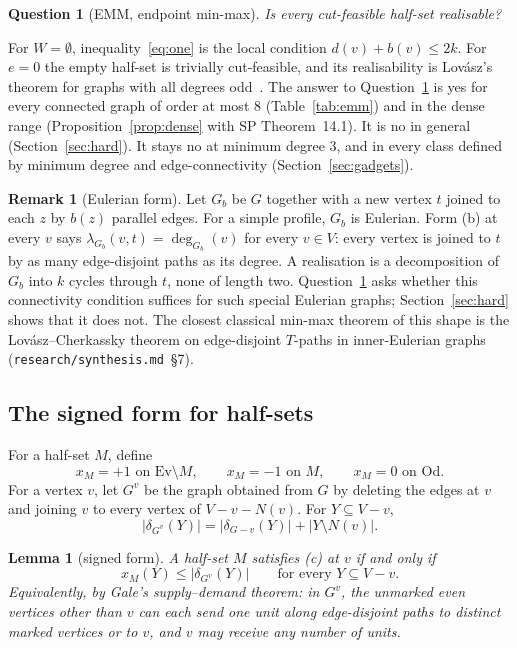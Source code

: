 \documentclass[11pt]{amsart}
\newtheorem{lemma}[theorem]{Lemma}
\newtheorem{question}[theorem]{Question}
\theoremstyle{definition}
\newtheorem{remark}[theorem]{Remark}
\newcommand{\Ev}{\mathrm{Ev}}
\newcommand{\Od}{\mathrm{Od}}
\begin{document}
\begin{question}[EMM, endpoint min-max]\label{conj:emm}
Is every cut-feasible half-set realisable?
\end{question}

For $W=\emptyset$, inequality~\eqref{eq:one} is the local condition $d(v)+b(v)\le 2k$. For $e=0$ the
empty half-set is trivially cut-feasible, and its realisability is Lov\'asz's theorem for graphs with
all degrees odd~\cite{L68}. The answer to Question~\ref{conj:emm} is yes for every connected graph of
order at most $8$ (Table~\ref{tab:emm}) and in the dense range (Proposition~\ref{prop:dense} with SP
Theorem~14.1). It is no in general (Section~\ref{sec:hard}). It stays no at minimum degree $3$, and in every
class defined by minimum degree and edge-connectivity (Section~\ref{sec:gadgets}).

\begin{remark}[Eulerian form]\label{rem:euler}
Let $G_b$ be $G$ together with a new vertex $t$ joined to each $z$ by $b(z)$ parallel edges. For a
simple profile, $G_b$ is Eulerian. Form (b) at every $v$ says $\lambda_{G_b}(v,t)=\deg_{G_b}(v)$ for
every $v\in V$: every vertex is joined to $t$ by as many edge-disjoint paths as its degree. A
realisation is a decomposition of $G_b$ into $k$ cycles through $t$, none of length two.
Question~\ref{conj:emm} asks whether this connectivity condition suffices for such special Eulerian
graphs; Section~\ref{sec:hard} shows that it does not. The closest
classical min-max theorem of this shape is the Lov\'asz--Cherkassky theorem on edge-disjoint
$T$-paths in inner-Eulerian graphs (\texttt{research/synthesis.md}~\S7).
\end{remark}

\subsection{The signed form for half-sets}
For a half-set $M$, define
\[
x_M=+1 \text{ on } \Ev\setminus M,\qquad x_M=-1\text{ on }M,\qquad x_M=0\text{ on }\Od.
\]
For a vertex $v$, let $G^v$ be the graph obtained from $G$ by deleting the edges at $v$ and joining
$v$ to every vertex of $V-v-N(v)$. For $Y\subseteq V-v$,
\[
|\delta_{G^v}(Y)|=|\delta_{G-v}(Y)|+|Y\setminus N(v)|.
\]

\begin{lemma}[signed form]\label{lem:signed}
A half-set $M$ satisfies (c) at $v$ if and only if
\begin{equation}\label{eq:signed}
x_M(Y)\le|\delta_{G^v}(Y)|\qquad\text{for every } Y\subseteq V-v .
\end{equation}
Equivalently, by Gale's supply--demand theorem: in $G^v$, the unmarked even vertices other than $v$
can each send one unit along edge-disjoint paths to distinct marked vertices or to $v$, and $v$ may
receive any number of units.
\end{lemma}
\end{document}
